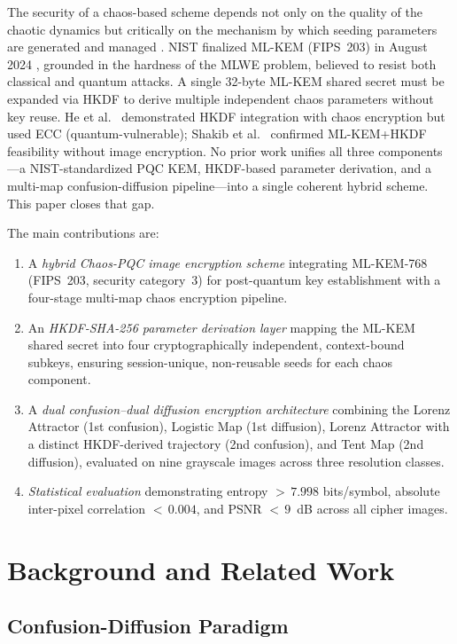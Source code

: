\documentclass[conference]{IEEEtran}
\begin{document}
The security of a chaos-based scheme depends not only on the quality of the chaotic dynamics but critically on the mechanism by which seeding parameters are generated and managed \cite{b20}. NIST finalized ML-KEM (FIPS~203) in August 2024 \cite{b6}, grounded in the hardness of the MLWE problem, believed to resist both classical and quantum attacks. A single 32-byte ML-KEM shared secret must be expanded via HKDF \cite{b7,b8} to derive multiple independent chaos parameters without key reuse. He et al.\ \cite{b20} demonstrated HKDF integration with chaos encryption but used ECC (quantum-vulnerable); Shakib et al.\ \cite{b23} confirmed ML-KEM+HKDF feasibility without image encryption. No prior work unifies all three components---a NIST-standardized PQC KEM, HKDF-based parameter derivation, and a multi-map confusion-diffusion pipeline---into a single coherent hybrid scheme. This paper closes that gap.

The main contributions are:
\begin{enumerate}
	\item A \textit{hybrid Chaos-PQC image encryption scheme} integrating ML-KEM-768 (FIPS~203, security category~3) for post-quantum key establishment with a four-stage multi-map chaos encryption pipeline.
	\item An \textit{HKDF-SHA-256 parameter derivation layer} mapping the ML-KEM shared secret into four cryptographically independent, context-bound subkeys, ensuring session-unique, non-reusable seeds for each chaos component.
	\item A \textit{dual confusion--dual diffusion encryption architecture} combining the Lorenz Attractor (1st confusion), Logistic Map (1st diffusion), Lorenz Attractor with a distinct HKDF-derived trajectory (2nd confusion), and Tent Map (2nd diffusion), evaluated on nine grayscale images across three resolution classes.
	\item \textit{Statistical evaluation} demonstrating entropy ${>}\,7.998$ bits/symbol, absolute inter-pixel correlation ${<}\,0.004$, and PSNR ${<}\,9$~dB across all cipher images.
\end{enumerate}

\section{Background and Related Work}

\subsection{Confusion-Diffusion Paradigm}
\end{document}
